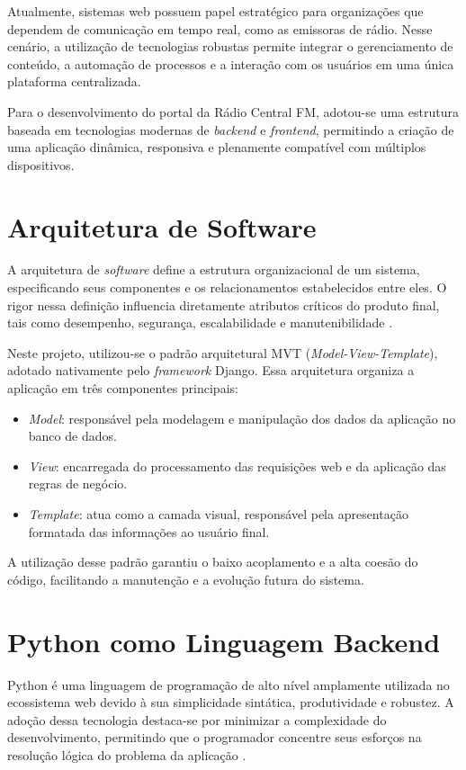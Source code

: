 \documentclass[12pt, openright, oneside, a4paper, brazil]{ads-unipac-abntex2}
\begin{document}
Atualmente, sistemas web possuem papel estratégico para organizações que dependem de comunicação em tempo real, como as emissoras de rádio. Nesse cenário, a utilização de tecnologias robustas permite integrar o gerenciamento de conteúdo, a automação de processos e a interação com os usuários em uma única plataforma centralizada.

Para o desenvolvimento do portal da Rádio Central FM, adotou-se uma estrutura baseada em tecnologias modernas de \textit{backend} e \textit{frontend}, permitindo a criação de uma aplicação dinâmica, responsiva e plenamente compatível com múltiplos dispositivos.

\section{Arquitetura de Software}

A arquitetura de \textit{software} define a estrutura organizacional de um sistema, especificando seus componentes e os relacionamentos estabelecidos entre eles. O rigor nessa definição influencia diretamente atributos críticos do produto final, tais como desempenho, segurança, escalabilidade e manutenibilidade \cite{bass}.

Neste projeto, utilizou-se o padrão arquitetural MVT (\textit{Model-View-Template}), adotado nativamente pelo \textit{framework} Django. Essa arquitetura organiza a aplicação em três componentes principais:

\begin{itemize}
    \item \textit{Model}: responsável pela modelagem e manipulação dos dados da aplicação no banco de dados.
    \item \textit{View}: encarregada do processamento das requisições web e da aplicação das regras de negócio.
    \item \textit{Template}: atua como a camada visual, responsável pela apresentação formatada das informações ao usuário final.
\end{itemize}

A utilização desse padrão garantiu o baixo acoplamento e a alta coesão do código, facilitando a manutenção e a evolução futura do sistema.

\section{Python como Linguagem Backend}

Python é uma linguagem de programação de alto nível amplamente utilizada no ecossistema web devido à sua simplicidade sintática, produtividade e robustez. A adoção dessa tecnologia destaca-se por minimizar a complexidade do desenvolvimento, permitindo que o programador concentre seus esforços na resolução lógica do problema da aplicação \cite{matthees}.
\end{document}
